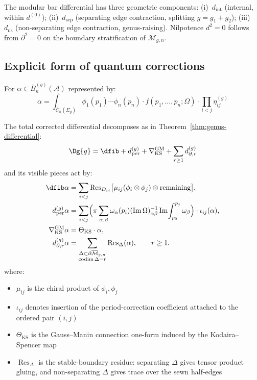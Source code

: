 \begin{remark}
\label{rem:modular-differential-decomposition}
The modular bar differential has three geometric components:
(i)~$d_{\mathrm{int}}$ (internal, within $d^{(0)}$);
(ii)~$d_{\mathrm{sep}}$ (separating edge contraction, splitting
$g=g_1+g_2$);
(iii)~$d_{\mathrm{ns}}$ (non-separating edge contraction,
genus-raising).
Nilpotence $d^2=0$ follows from $\partial^2=0$ on the boundary
stratification of $\overline{\mathcal{M}}_{g,n}$.
\end{remark}

\subsection{Explicit form of quantum corrections}

\begin{theorem}
\label{thm:concrete-quantum-differential}
For $\alpha \in \bar{B}^{(g)}_n(\mathcal{A})$ represented by:
\begin{equation}
\alpha = \int_{\overline{C}_n(\Sigma_g)} \phi_1(p_1) \cdots \phi_n(p_n) \cdot f(p_1, \ldots, p_n; \Omega) \cdot \prod_{i<j} \eta_{ij}^{(g)}
\end{equation}

The total corrected differential decomposes as in
Theorem~\ref{thm:genus-differential}:
\[
\Dg{g}
=
\dfib+d_{\mathrm{per}}^{(g)}
+\nabla_{\mathrm{KS}}^{\mathrm{GM}}
+\sum_{r\geq1}d_{\partial,r}^{(g)}
\]
and its visible pieces act by:
\begin{align}
\dfib\alpha
&= \sum_{i<j}
\mathrm{Res}_{D_{ij}}
\bigl[\mu_{ij}(\phi_i\otimes\phi_j)\otimes
\mathrm{remaining}\bigr],\\
d_{\mathrm{per}}^{(g)}\alpha
&=
\sum_{i<j}
\Bigl(\pi\sum_{\alpha,\beta}
\omega_\alpha(p_i)(\operatorname{Im}\Omega)^{-1}_{\alpha\beta}
\operatorname{Im}\!\int_{p_0}^{p_j}\omega_\beta\Bigr)
\cdot \iota_{ij}(\alpha),\\
\nabla_{\mathrm{KS}}^{\mathrm{GM}}\alpha
&=
\Theta_{\mathrm{KS}}\cdot\alpha,\\
d_{\partial,r}^{(g)}\alpha
&=
\sum_{\substack{\Delta\subset
\partial\overline{\mathcal M}_{g,n}\\
\operatorname{codim}\Delta=r}}
\operatorname{Res}_{\Delta}(\alpha),
\qquad r\geq1 .
\end{align}
where:
\begin{itemize}
\item $\mu_{ij}$ is the chiral product of $\phi_i, \phi_j$
\item $\iota_{ij}$ denotes insertion of the period-correction
coefficient attached to the ordered pair $(i,j)$
\item $\Theta_{\mathrm{KS}}$ is the Gauss--Manin connection
one-form induced by the Kodaira--Spencer map
\item $\operatorname{Res}_{\Delta}$ is the stable-boundary residue:
separating $\Delta$ gives tensor product gluing, and
non-separating $\Delta$ gives trace over the sewn half-edges
\end{itemize}
\end{theorem}

